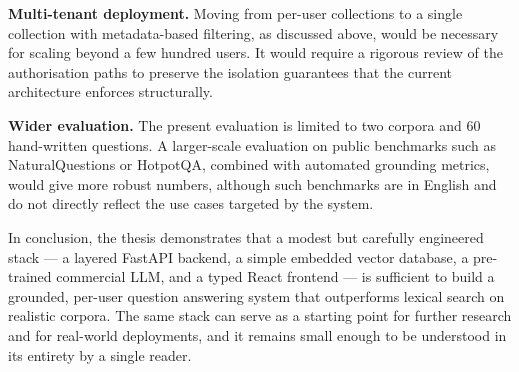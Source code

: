 \textbf{Multi-tenant deployment.} Moving from per-user collections to a
single collection with metadata-based filtering, as discussed above,
would be necessary for scaling beyond a few hundred users. It would
require a rigorous review of the authorisation paths to preserve the
isolation guarantees that the current architecture enforces structurally.

\textbf{Wider evaluation.} The present evaluation is limited to two
corpora and 60 hand-written questions. A larger-scale evaluation on
public benchmarks such as NaturalQuestions or HotpotQA, combined with
automated grounding metrics, would give more robust numbers, although
such benchmarks are in English and do not directly reflect the use
cases targeted by the system.

\vspace{1em}

In conclusion, the thesis demonstrates that a modest but carefully
engineered stack --- a layered FastAPI backend, a simple embedded
vector database, a pre-trained commercial LLM, and a typed React
frontend --- is sufficient to build a grounded, per-user question
answering system that outperforms lexical search on realistic
corpora. The same stack can serve as a starting point for further
research and for real-world deployments, and it remains small enough
to be understood in its entirety by a single reader.
